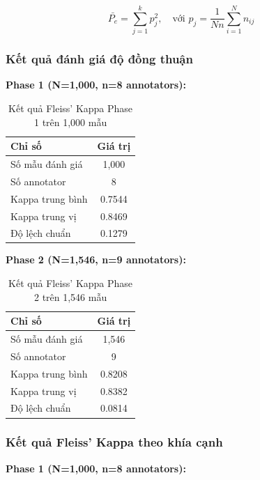 \begin{equation}
\bar{P_e} = \sum_{j=1}^{k} p_j^2, \quad \text{với } p_j = \frac{1}{Nn} \sum_{i=1}^{N} n_{ij}
\end{equation}

\subsubsection{Kết quả đánh giá độ đồng thuận}

\textbf{Phase 1 (N=1,000, n=8 annotators):}

\begin{table}[H]
\centering
\begin{tabular}{|l|c|}
\hline
\textbf{Chỉ số} & \textbf{Giá trị} \\
\hline
Số mẫu đánh giá & 1,000 \\
\hline
Số annotator & 8 \\
\hline
Kappa trung bình & 0.7544 \\
\hline
Kappa trung vị & 0.8469 \\
\hline
Độ lệch chuẩn & 0.1279 \\
\hline
\end{tabular}
\caption{Kết quả Fleiss' Kappa Phase 1 trên 1,000 mẫu}
\label{tab:fleiss-kappa-phase1-summary}
\end{table}

\textbf{Phase 2 (N=1,546, n=9 annotators):}

\begin{table}[H]
\centering
\begin{tabular}{|l|c|}
\hline
\textbf{Chỉ số} & \textbf{Giá trị} \\
\hline
Số mẫu đánh giá & 1,546 \\
\hline
Số annotator & 9 \\
\hline
Kappa trung bình & 0.8208 \\
\hline
Kappa trung vị & 0.8382 \\
\hline
Độ lệch chuẩn & 0.0814 \\
\hline
\end{tabular}
\caption{Kết quả Fleiss' Kappa Phase 2 trên 1,546 mẫu}
\label{tab:fleiss-kappa}
\end{table}

\subsubsection{Kết quả Fleiss' Kappa theo khía cạnh}

\textbf{Phase 1 (N=1,000, n=8 annotators):}

